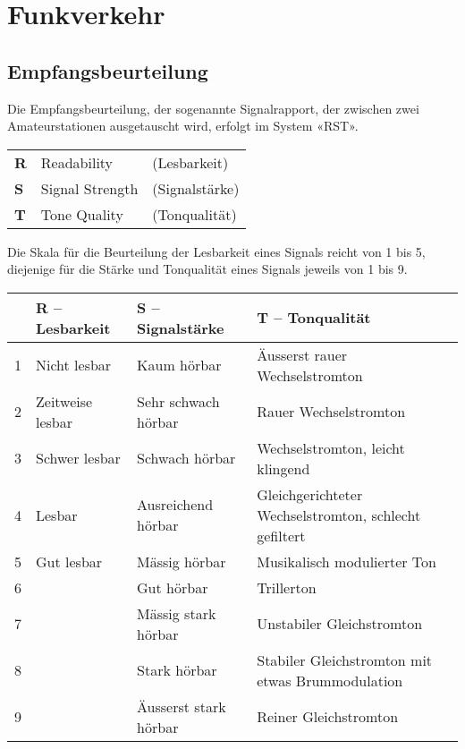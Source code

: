 \chapter{Funkverkehr}
\section{Empfangsbeurteilung}\label{sec:rst}
Die Empfangsbeurteilung, der sogenannte Signalrapport, der zwischen zwei Amateurstationen aus­getauscht wird, erfolgt im System «RST».

\vspace{1em}
\begin{tabular}{lll}
\textbf{R} & Readability & (Lesbarkeit) \\
\textbf{S} & Signal Strength & (Signalstärke)\\
\textbf{T} & Tone Quality & (Tonqualität)
\end{tabular}
\vspace{1em}

Die Skala für die Beurteilung der Lesbarkeit eines Signals reicht von 1 bis 5, diejenige für die Stärke und Tonqualität eines Signals jeweils von 1 bis 9.

\vspace{1em}
\begin{tabular}{llll}
 & R – Lesbarkeit & S – Signalstärke & T – Tonqualität \\ \toprule \arrayrulecolor{rowsep}
1 & Nicht lesbar & Kaum hörbar & Äusserst rauer Wechselstromton \\ \midrule
2 & Zeitweise lesbar & Sehr schwach hörbar & Rauer Wechselstromton \\ \midrule
3 & Schwer lesbar & Schwach hörbar & Wechselstromton, leicht klingend \\ \midrule
4 & Lesbar & Ausreichend hörbar & \begin{minipage}[t]{4cm}{\raggedright Gleichgerichteter Wechsel\-strom\-ton, schlecht gefiltert}\end{minipage} \\ \midrule
5 & Gut lesbar & Mässig hörbar & Musikalisch modulierter Ton \\ \midrule
6 &  & Gut hörbar & Trillerton \\ \midrule
7 &  & Mässig stark hörbar & Unstabiler Gleichstromton \\ \midrule
8 &  & Stark hörbar & \begin{minipage}[t]{4cm}{\raggedright Stabiler Gleichstromton mit etwas Brummodulation}\end{minipage} \\ \midrule
9 &  & Äusserst stark hörbar & Reiner Gleichstromton \\ \midrule
\end{tabular}
\vspace{1em}

